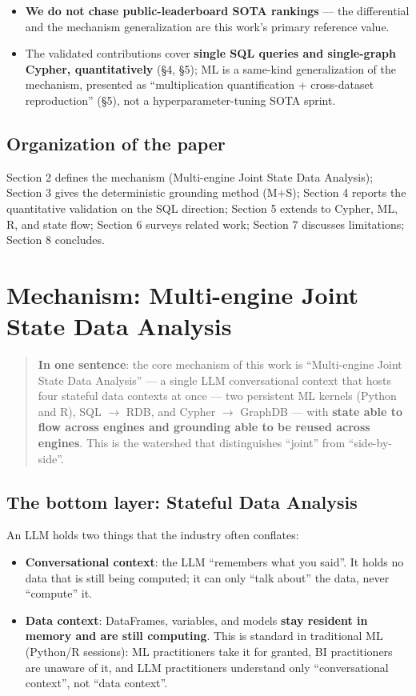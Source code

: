 \documentclass[11pt]{article}
\begin{document}
\begin{itemize}
\item
  \textbf{We do not chase public-leaderboard SOTA rankings} --- the differential and the mechanism generalization are this work's primary reference value.
\item
  The validated contributions cover \textbf{single SQL queries and single-graph Cypher, quantitatively} (\S{}4, \S{}5); ML is a same-kind generalization of the mechanism, presented as ``multiplication quantification + cross-dataset reproduction'' (\S{}5), not a hyperparameter-tuning SOTA sprint.
\end{itemize}

\subsection{Organization of the paper}

Section 2 defines the mechanism (Multi-engine Joint State Data Analysis); Section 3 gives the deterministic grounding method (M+S); Section 4 reports the quantitative validation on the SQL direction; Section 5 extends to Cypher, ML, R, and state flow; Section 6 surveys related work; Section 7 discusses limitations; Section 8 concludes.

\section{Mechanism: Multi-engine Joint State Data Analysis}

\begin{quote}
\textbf{In one sentence}: the core mechanism of this work is ``Multi-engine Joint State Data Analysis'' --- a single LLM conversational context that hosts four stateful data contexts at once --- two persistent ML kernels (Python and R), SQL $\rightarrow$ RDB, and Cypher $\rightarrow$ GraphDB --- with \textbf{state able to flow across engines and grounding able to be reused across engines}. This is the watershed that distinguishes ``joint'' from ``side-by-side''.
\end{quote}

\subsection{The bottom layer: Stateful Data Analysis}

An LLM holds two things that the industry often conflates:

\begin{itemize}
\item
  \textbf{Conversational context}: the LLM ``remembers what you said''. It holds no data that is still being computed; it can only ``talk about'' the data, never ``compute'' it.
\item
  \textbf{Data context}: DataFrames, variables, and models \textbf{stay resident in memory and are still computing}. This is standard in traditional ML (Python/R sessions): ML practitioners take it for granted, BI practitioners are unaware of it, and LLM practitioners understand only ``conversational context'', not ``data context''.
\end{itemize}
\end{document}
